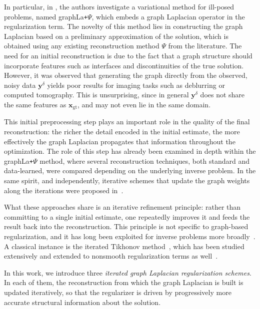 \documentclass{article}
\theoremstyle{remark}
\newcommand{\gt}{\bm{x}_{\mathrm{gt}}}
\newcommand{\by}{{\bm{y}}}
\begin{document}
In particular, in \cite{bianchi2025data}, the authors investigate a variational method for ill-posed problems, named graphLa\texttt{+}$\Psi$, which
embeds a graph Laplacian operator in the regularization term. The novelty of this method lies in constructing the graph Laplacian based on a preliminary approximation of the solution, which is
obtained using any existing reconstruction method $\Psi$ from the literature. The need for an initial reconstruction is due to the fact that a graph structure should incorporate features such as interfaces and discontinuities of the true solution. However, it was observed that generating the graph directly from the observed,
noisy data $\by^{\delta}$ yields poor results for imaging tasks such as
deblurring or computed tomography. This is unsurprising, since in general
$\by^{\delta}$ does not share the same features as $\gt$, and may not even lie
in the same domain.

This initial preprocessing step plays an important role in the quality of the
final reconstruction: the richer the detail encoded in the initial estimate,
the more effectively the graph Laplacian propagates that information throughout
the optimization. The role of this step has already been examined in depth
within the graphLa\texttt{+}$\Psi$ method, where several reconstruction
techniques, both standard and data-learned, were compared depending on the
underlying inverse problem. In the same spirit, and independently, iterative
schemes that update the graph weights along the iterations were proposed
in~\cite{Peyre2008nonlocal,zhang2010bregmanized,arias2009variational}.

What these approaches share is an iterative refinement principle: rather
than committing to a single initial estimate, one repeatedly improves it and
feeds the result back into the reconstruction. This principle is not specific to
graph-based regularization, and it has long been exploited for inverse problems
more broadly~\cite{nagy2026mixed}. A classical instance is the iterated Tikhonov
method~\cite[Chapter~6]{engl1996regularization}, which has been studied
extensively and extended to nonsmooth regularization terms as
well~\cite{huang2013nonstationary,aleotti2025nested,jin2012nonstationary,jin2014nonstationary,bianchi2023uniformly,bianchi2026iterated,bianchi2015iterated,bianchi2025convergence}.
 
 
In this work, we introduce three \emph{iterated graph Laplacian regularization
schemes}. In each of them, the reconstruction from which the graph Laplacian is
built is updated iteratively, so that the regularizer is driven by progressively
more accurate structural information about the solution.
\end{document}
